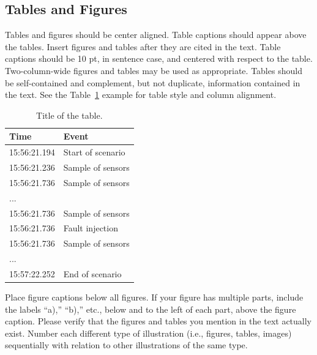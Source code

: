 \documentclass[IJPHM, 2014, 00]{PHMSociety}
\begin{document}
\subsection{Tables and Figures}
Tables and figures should be center aligned. %
Table captions should appear above the tables. Insert figures and tables after they are cited in the text. Table captions should be 10 pt, in sentence case, and centered with respect to the table. Two-column-wide figures and tables may be used as appropriate. Tables should be self-contained and complement, but not duplicate, information contained in the text. See the Table~\ref{table1} example for table style and column alignment. 


\begin{table}[t] \small  
	\begin{center}  
		
	\caption{Title of the table.}
		\label{table1}
	
	\begin{tabular}{ l | l }
		\hline \hline
		\textbf{Time}	& \textbf{Event}              \\ 
		\hline \hline
		15:56:21.194	& Start of scenario  \\ \hline
		15:56:21.236	& Sample of sensors  \\ \hline
		15:56:21.736	& Sample of sensors  \\ \hline
		...           &                    \\ \hline
		15:56:21.736	& Sample of sensors  \\ \hline
		15:56:21.736	& Fault injection  \\ \hline
		15:56:21.736	& Sample of sensors  \\ \hline
		...           &                    \\ \hline
		15:57:22.252	& End of scenario    \\ \hline
	\end{tabular}
	\end{center}
\end{table}


Place figure captions below all figures. If your figure has multiple parts, include the labels ``a),'' ``b),'' etc., below and to the left of each part, above the figure caption. Please verify that the figures and tables you mention in the text actually exist. Number each different type of illustration (i.e., figures, tables, images) sequentially with relation to other illustrations of the same type.
\end{document}
